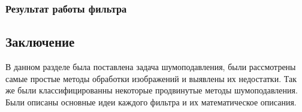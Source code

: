 \subsubsection{Результат работы фильтра}
\begin{figure}[H]\label{img:tv}
	\begin{minipage}[H]{0.49\linewidth}
	\end{minipage}
	\begin{minipage}[H]{0.49\linewidth}
	\end{minipage}
\end{figure}

\subsection{Заключение}
В данном разделе была поставлена задача шумоподавления, были рассмотрены самые простые методы обработки изображений и выявлены их недостатки. Так же были классифицированны некоторые продвинутые методы шумоподавления. Были описаны основные идеи каждого фильтра и их математическое описания.